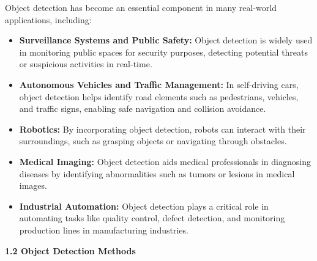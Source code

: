 %
Object detection has become an essential component in many real-world applications, including:
%
\begin{itemize}
  \item \textbf{Surveillance Systems and Public Safety:} Object detection is widely used in monitoring public spaces for security purposes, detecting potential threats or suspicious activities in real-time.
  \item \textbf{Autonomous Vehicles and Traffic Management:} In self-driving cars, object detection helps identify road elements such as pedestrians, vehicles, and traffic signs, enabling safe navigation and collision avoidance.
  \item \textbf{Robotics:} By incorporating object detection, robots can interact with their surroundings, such as grasping objects or navigating through obstacles.
  \item \textbf{Medical Imaging:} Object detection aids medical professionals in diagnosing diseases by identifying abnormalities such as tumors or lesions in medical images.
  \item \textbf{Industrial Automation:} Object detection plays a critical role in automating tasks like quality control, defect detection, and monitoring production lines in manufacturing industries.
  \\
\end{itemize}
%
{ \textbf{1.2 {Object Detection Methods}}}
\\
%
